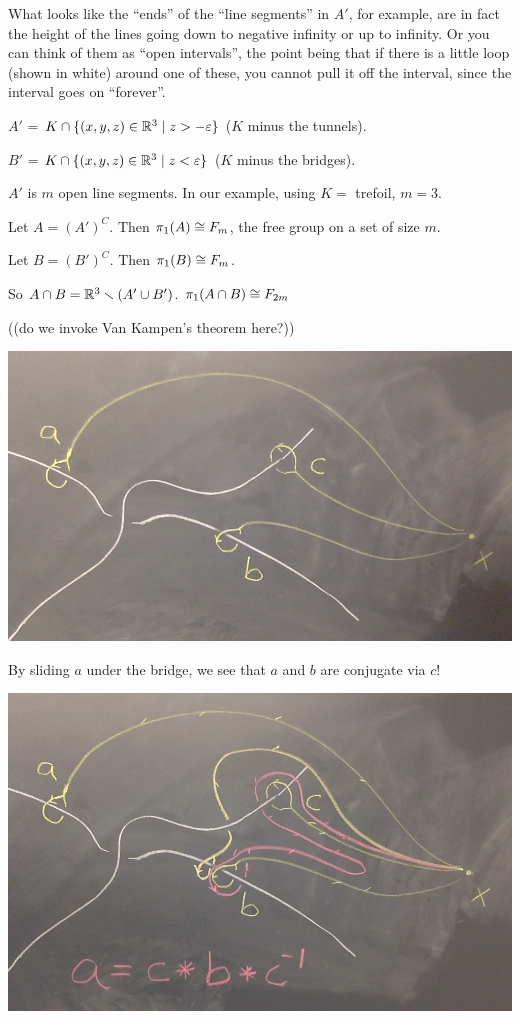 \documentclass[11pt,leqno,oneside]{amsart}
\numberwithin{thm}{section}
\newcommand{\minus}{\smallsetminus}
\renewcommand{\epsilon}{\varepsilon}
\newcommand{\fund}[1][1]{\pi_{#1}}
\begin{document}
\begin{example}
  What looks like the ``ends'' of the ``line segments'' in $A'$, for
  example, are in fact the height of the lines going down to negative
  infinity or up to infinity.  Or you can think of them as ``open
  intervals'', the point being that if there is a little loop (shown
  in white) around one of these, you cannot pull it off the interval,
  since the interval goes on ``forever''.

  $A'$ = $K \cap \{(x,y,z) \in \R^3 \suchthat z > -\epsilon\}$ ($K$ minus
  the tunnels).

  $B'$ = $K \cap \{(x,y,z) \in \R^3 \suchthat z < \epsilon\}$ ($K$ minus
  the bridges).

  $A'$ is $m$ open line segments.  In our example, using $K =$
  trefoil, $m = 3$.

  Let $A = (A')^C$.  Then $\fund(A) \isom F_m$, the free group on a
  set of size $m$.

  Let $B = (B')^C$.  Then $\fund(B) \isom F_m$.

  So $A \cap B = \R^3 \minus (A' \union B')$.
  $\fund(A \cap B) \isom F_{2m}$

  ((do we invoke Van Kampen's theorem here?))

  \includegraphics[scale=0.2]{images/mountains.jpg}

  By sliding $a$ under the bridge, we see that $a$ and $b$ are
  conjugate via $c$!

  \includegraphics[scale=0.2]{images/mountains-with-explanation.jpg}


\end{example}
\end{document}
